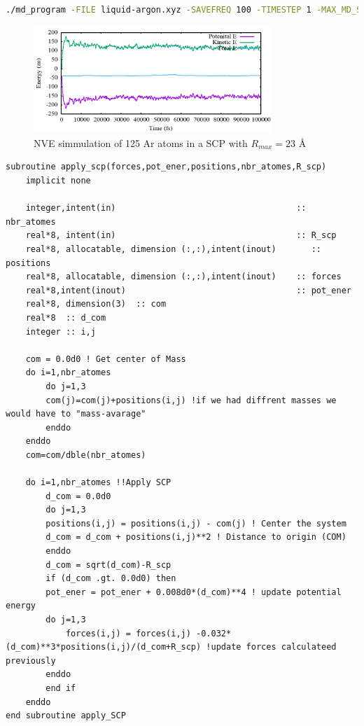 \documentclass{cis320}
\begin{document}
\begin{lstlisting}[language=bash]
  ./md_program -FILE liquid-argon.xyz -SAVEFREQ 100 -TIMESTEP 1 -MAX_MD_STEPS 100000  -SCP 23 -TEMP 0\end{lstlisting}

\begin{figure}[th!]
    \centering
    \includegraphics[width=0.8\textwidth]{SCP.png}
    \caption{NVE simmulation of 125 Ar atoms in a SCP with $R_{max}=23$ \r{A}}
    \label{fig:SCP}
\end{figure}

\begin{lstlisting}[caption=Subroutine to apply a SCP.]
subroutine apply_scp(forces,pot_ener,positions,nbr_atomes,R_scp)
    implicit none
    
    integer,intent(in)                                    :: nbr_atomes
    real*8, intent(in)                                    :: R_scp
    real*8, allocatable, dimension (:,:),intent(inout)       :: positions
    real*8, allocatable, dimension (:,:),intent(inout)    :: forces
    real*8,intent(inout)                                  :: pot_ener
    real*8, dimension(3)  :: com
    real*8  :: d_com
    integer :: i,j
    
    com = 0.0d0 ! Get center of Mass
    do i=1,nbr_atomes
        do j=1,3
        com(j)=com(j)+positions(i,j) !if we had diffrent masses we would have to "mass-avarage"
        enddo
    enddo
    com=com/dble(nbr_atomes) 
    
    do i=1,nbr_atomes !!Apply SCP
        d_com = 0.0d0
        do j=1,3
        positions(i,j) = positions(i,j) - com(j) ! Center the system
        d_com = d_com + positions(i,j)**2 ! Distance to origin (COM)
        enddo
        d_com = sqrt(d_com)-R_scp
        if (d_com .gt. 0.0d0) then
        pot_ener = pot_ener + 0.008d0*(d_com)**4 ! update potential energy
        do j=1,3
            forces(i,j) = forces(i,j) -0.032*(d_com)**3*positions(i,j)/(d_com+R_scp) !update forces calculateed previously
        enddo
        end if
    enddo
end subroutine apply_SCP \end{lstlisting}
\end{document}

